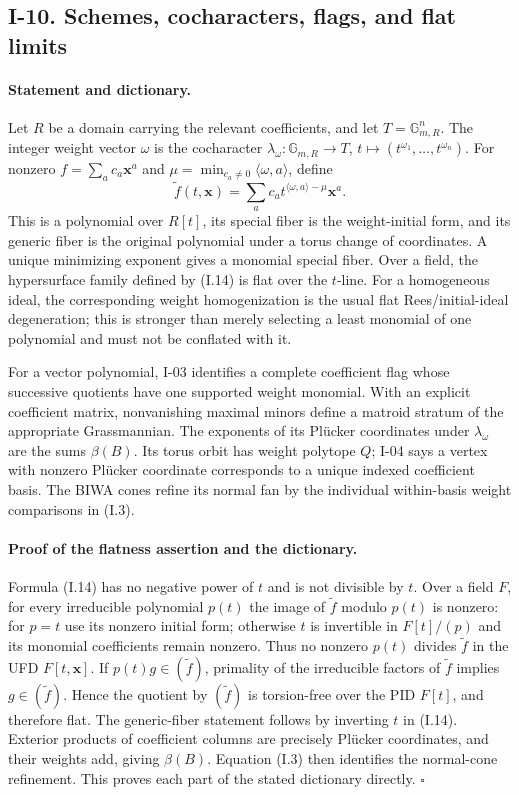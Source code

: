 \documentclass[11pt,a4paper]{article}
\theoremstyle{definition}\newtheorem{definition}{Definition}
\begin{document}
\subsection{I-10. Schemes, cocharacters, flags, and flat limits}
\label{I-10}

\paragraph{Statement and dictionary.}
Let $R$ be a domain carrying the relevant coefficients, and let
$T=\mathbb G_{m,R}^{n}$.  The integer weight vector $\omega$
is the cocharacter
$\lambda_\omega:\mathbb G_{m,R}\to T$,
$t\mapsto(t^{\omega_1},\ldots,t^{\omega_n})$.
For nonzero $f=\sum_a c_a\mathbf x^a$ and
$\mu=\min_{c_a\ne0}\langle\omega,a\rangle$, define
\[
 \widetilde f(t,\mathbf x)=
 \sum_a c_a t^{\langle\omega,a\rangle-\mu}\mathbf x^a.
\tag{I.14}
\]
This is a polynomial over $R[t]$, its special fiber is the
weight-initial form, and its generic fiber is the original
polynomial under a torus change of coordinates.  A unique
minimizing exponent gives a monomial special fiber.  Over a field,
the hypersurface family defined by (I.14) is flat over the
$t$-line.  For a homogeneous ideal, the corresponding weight
homogenization is the usual flat Rees/initial-ideal degeneration;
this is stronger than merely selecting a least monomial of one
polynomial and must not be conflated with it.

For a vector polynomial, I-03 identifies a complete coefficient
flag whose successive quotients have one supported weight
monomial.  With an explicit coefficient matrix, nonvanishing
maximal minors define a matroid stratum of the appropriate
Grassmannian.  The exponents of its Pl\"ucker coordinates under
$\lambda_\omega$ are the sums $\beta(B)$.  Its torus orbit has
weight polytope $Q$; I-04 says a vertex with nonzero Pl\"ucker
coordinate corresponds to a unique indexed coefficient basis.
The BIWA cones refine its normal fan by the individual
within-basis weight comparisons in (I.3).

\paragraph{Proof of the flatness assertion and the dictionary.}
Formula (I.14) has no negative power of $t$ and is not divisible
by $t$.  Over a field $F$, for every irreducible polynomial
$p(t)$ the image of $\widetilde f$ modulo $p(t)$ is nonzero:
for $p=t$ use its nonzero initial form; otherwise $t$ is invertible
in $F[t]/(p)$ and its monomial coefficients remain nonzero.
Thus no nonzero $p(t)$ divides $\widetilde f$ in the UFD
$F[t,\mathbf x]$.  If $p(t)g\in(\widetilde f)$, primality of
the irreducible factors of $\widetilde f$ implies
$g\in(\widetilde f)$.  Hence the quotient by
$(\widetilde f)$ is torsion-free over the PID $F[t]$, and
therefore flat.  The generic-fiber statement follows by
inverting $t$ in (I.14).  Exterior products of coefficient
columns are precisely Pl\"ucker coordinates, and their weights
add, giving $\beta(B)$.  Equation (I.3) then identifies the
normal-cone refinement.  This proves each part of the stated
dictionary directly. \hfill$\square$
\end{document}
